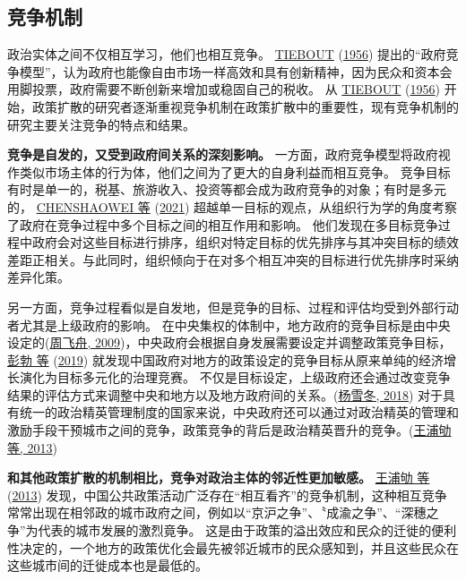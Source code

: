 \documentclass[
  12pt,
]{ctexart}
\begin{document}
\hypertarget{ux7adeux4e89ux673aux5236}{%
\subsection{竞争机制}\label{ux7adeux4e89ux673aux5236}}

政治实体之间不仅相互学习，他们也相互竞争。 \protect\hyperlink{ref-Tiebout1956}{TIEBOUT} (\protect\hyperlink{ref-Tiebout1956}{1956}) 提出的``政府竞争模型''，认为政府也能像自由市场一样高效和具有创新精神，因为民众和资本会用脚投票，政府需要不断创新来增加或稳固自己的税收。
从 \protect\hyperlink{ref-Tiebout1956}{TIEBOUT} (\protect\hyperlink{ref-Tiebout1956}{1956}) 开始，政策扩散的研究者逐渐重视竞争机制在政策扩散中的重要性，现有竞争机制的研究主要关注竞争的特点和结果。

\textbf{竞争是自发的，又受到政府间关系的深刻影响。}
一方面，政府竞争模型将政府视作类似市场主体的行为体，他们之间为了更大的自身利益而相互竞争。
竞争目标有时是单一的，税基、旅游收入、投资等都会成为政府竞争的对象；有时是多元的， \protect\hyperlink{ref-ChenShaoweiJiaKai2021}{CHENSHAOWEI 等} (\protect\hyperlink{ref-ChenShaoweiJiaKai2021}{2021}) 超越单一目标的观点，从组织行为学的角度考察了政府在竞争过程中多个目标之间的相互作用和影响。
他们发现在多目标竞争过程中政府会对这些目标进行排序，组织对特定目标的优先排序与其冲突目标的绩效差距正相关。与此同时，组织倾向于在对多个相互冲突的目标进行优先排序时采纳差异化策。

另一方面，竞争过程看似是自发地，但是竞争的目标、过程和评估均受到外部行动者尤其是上级政府的影响。
在中央集权的体制中，地方政府的竞争目标是由中央设定的(\protect\hyperlink{ref-ZhouFeiZhou2009a}{周飞舟, 2009})，中央政府会根据自身发展需要设定并调整政策竞争目标，\protect\hyperlink{ref-PengBoZhaoJi2019a}{彭勃 等} (\protect\hyperlink{ref-PengBoZhaoJi2019a}{2019}) 就发现中国政府对地方的政策设定的竞争目标从原来单纯的经济增长演化为目标多元化的治理竞赛。
不仅是目标设定，上级政府还会通过改变竞争结果的评估方式来调整中央和地方以及地方政府间的关系。(\protect\hyperlink{ref-YangXueDong2018a}{杨雪冬, 2018})
对于具有统一的政治精英管理制度的国家来说，中央政府还可以通过对政治精英的管理和激励手段干预城市之间的竞争，政策竞争的背后是政治精英晋升的竞争。(\protect\hyperlink{ref-WangPuQuLaiXianJin2013}{王浦劬 等, 2013})

\textbf{和其他政策扩散的机制相比，竞争对政治主体的邻近性更加敏感。}
\protect\hyperlink{ref-WangPuQuLaiXianJin2013}{王浦劬 等} (\protect\hyperlink{ref-WangPuQuLaiXianJin2013}{2013}) 发现，中国公共政策活动广泛存在``相互看齐''的竞争机制，这种相互竞争常常出现在相邻政的城市政府之间，例如以``京沪之争''、〝成渝之争''、``深穗之争''为代表的城市发展的激烈竟争。
这是由于政策的溢出效应和民众的迁徙的便利性决定的，一个地方的政策优化会最先被邻近城市的民众感知到，并且这些民众在这些城市间的迁徙成本也是最低的。
\end{document}
